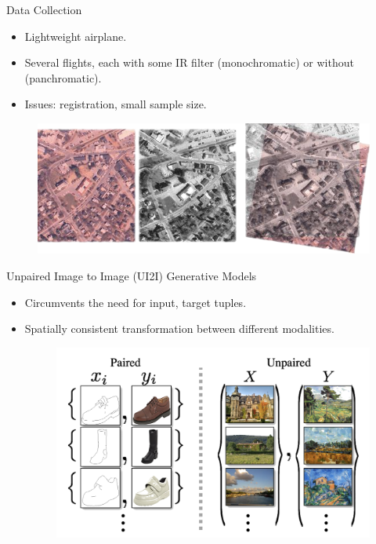 \begin{frame}{Data Collection}
  \begin{itemize}
        \item Lightweight airplane.
        \item Several flights, each with some IR filter (monochromatic) or without (panchromatic). \hyperlink{apndx:data_collection}{}
        \item Issues: registration, small sample size.
    \end{itemize}
    \begin{figure}
        \centering
        \includegraphics[width=0.8\linewidth]{../figs/introduction/registration.png}
      \end{figure}
  \end{frame}

\begin{frame}{Unpaired Image to Image (UI2I) Generative Models}
  \begin{itemize}
    \item Circumvents the need for \texttt{\textbraceleft} input, target \texttt{\textbraceright} tuples.
    \item Spatially consistent transformation between different modalities.
    \begin{figure}
      \centering
      \includegraphics[width=0.7\linewidth]{../figs/related_work/paird_vs_unpaired_I2I.png}
    \end{figure}
  \end{itemize}
\end{frame}

